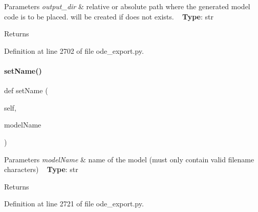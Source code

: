 \begin{DoxyParams}{Parameters}
{\em output\+\_\+dir} & relative or absolute path where the generated model code is to be placed. will be created if does not exists. ~\newline
{\bfseries{Type}}\+: str\\
\hline
\end{DoxyParams}
\begin{DoxyReturn}{Returns}

\end{DoxyReturn}


Definition at line 2702 of file ode\+\_\+export.\+py.

\mbox{\label{classamici_1_1ode__export_1_1_o_d_e_exporter_af9ec4a20beb62b41663733ecfc8e1713}} 
\paragraph{\texorpdfstring{setName()}{setName()}}
{\footnotesize\ttfamily def set\+Name (\begin{DoxyParamCaption}\item[{}]{self,  }\item[{}]{model\+Name }\end{DoxyParamCaption})}


\begin{DoxyParams}{Parameters}
{\em model\+Name} & name of the model (must only contain valid filename characters) ~\newline
{\bfseries{Type}}\+: str\\
\hline
\end{DoxyParams}
\begin{DoxyReturn}{Returns}

\end{DoxyReturn}


Definition at line 2721 of file ode\+\_\+export.\+py.

